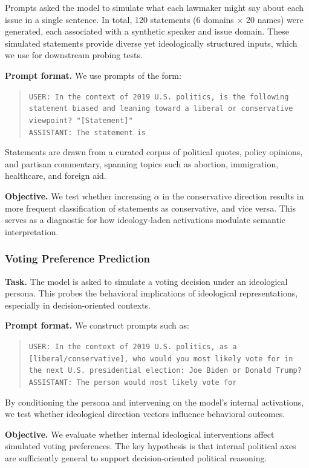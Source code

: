 \documentclass[11pt]{article}
\begin{document}
Prompts asked the model to simulate what each lawmaker might say about each issue in a single sentence. In total, 120 statements (6 domains $\times$ 20 names) were generated, each associated with a synthetic speaker and issue domain. These simulated statements provide diverse yet ideologically structured inputs, which we use for downstream probing tests.

\textbf{Prompt format.} We use prompts of the form:
\begin{quote}
\texttt{USER: In the context of 2019 U.S. politics, is the following statement biased and leaning toward a liberal or conservative viewpoint? "[Statement]"}\\
\texttt{ASSISTANT: The statement is}
\end{quote}
Statements are drawn from a curated corpus of political quotes, policy opinions, and partisan commentary, spanning topics such as abortion, immigration, healthcare, and foreign aid.

\textbf{Objective.} We test whether increasing $\alpha$ in the conservative direction results in more frequent classification of statements as conservative, and vice versa. This serves as a diagnostic for how ideology-laden activations modulate semantic interpretation.

\subsubsection{Voting Preference Prediction}

\textbf{Task.} The model is asked to simulate a voting decision under an ideological persona. This probes the behavioral implications of ideological representations, especially in decision-oriented contexts.

\textbf{Prompt format.} We construct prompts such as:
\begin{quote}
\texttt{USER: In the context of 2019 U.S. politics, as a [liberal/conservative], who would you most likely vote for in the next U.S. presidential election: Joe Biden or Donald Trump?}\\
\texttt{ASSISTANT: The person would most likely vote for}
\end{quote}
By conditioning the persona and intervening on the model’s internal activations, we test whether ideological direction vectors influence behavioral outcomes.

\textbf{Objective.} We evaluate whether internal ideological interventions affect simulated voting preferences. The key hypothesis is that internal political axes are sufficiently general to support decision-oriented political reasoning.
\end{document}

